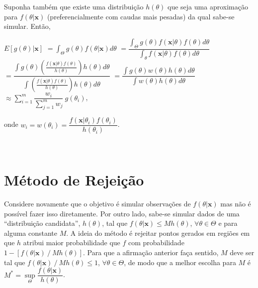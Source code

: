 \documentclass[
]{book}
\begin{document}
Suponha também que existe uma distribuição \(h(\theta)\) que seja uma aproximação para \(f(\theta|\boldsymbol x)\) (preferencialmente com caudas mais pesadas) da qual sabe-se simular. Então,

\(E\left[g(\theta)| \boldsymbol x\right]\)
\(=\displaystyle\int_\Theta g(\theta)f(\theta|\boldsymbol x)d\theta\)
\(=\dfrac{\displaystyle \int_\Theta g(\theta)f(\boldsymbol x|\theta)f(\theta)d\theta}{\displaystyle\int_\theta f(\boldsymbol x|\theta)f(\theta)d\theta}\)
\(=\dfrac{\displaystyle \int g(\theta)\left(\frac{f(\boldsymbol x|\theta)f(\theta)}{h(\theta)}\right)h(\theta)d\theta}{\displaystyle\int\left(\frac{f(\boldsymbol x|\theta)f(\theta)}{h(\theta)}\right)h(\theta)d\theta}\) \(=\dfrac{\displaystyle\int g(\theta)w(\theta)h(\theta)d\theta}{\displaystyle\int w(\theta)h(\theta)d\theta}\)
\(\approx \displaystyle\sum_{i=1}^m \dfrac{w_i}{\sum_{j=1}^mw_j}~g(\theta_i)\),

onde \(w_i=w(\theta_i)=\dfrac{f(\boldsymbol x|\theta_i)f(\theta_i)}{h(\theta_i)}\).

\(~\)

\hypertarget{muxe9todo-de-rejeiuxe7uxe3o}{%
\section{Método de Rejeição}\label{muxe9todo-de-rejeiuxe7uxe3o}}

Considere novamente que o objetivo é simular observações de \(f(\theta|\boldsymbol x)\) mas não é possível fazer isso diretamente. Por outro lado, sabe-se simular dados de uma ``distribuição candidata'', \(h(\theta)\), tal que \(f(\theta|\boldsymbol x)\leq Mh(\theta)\), \(\forall \theta \in \Theta\) e para alguma constante \(M\). A ideia do método é rejeitar pontos gerados em regiões em que \(h\) atribui maior probabilidade que \(f\) com probabilidade \(1-\left[f(\theta|\boldsymbol x)~/~Mh(\theta)\right]\). Para que a afirmação anterior faça sentido, \(M\) deve ser tal que \(f(\theta|\boldsymbol x)~/~ Mh(\theta) \leq 1\), \(\forall \theta \in \Theta\), de modo que a melhor escolha para \(M\) é \(M^*=\underset{\Theta}{\sup}\dfrac{f(\theta|\boldsymbol x)}{h(\theta)}\).
\end{document}
